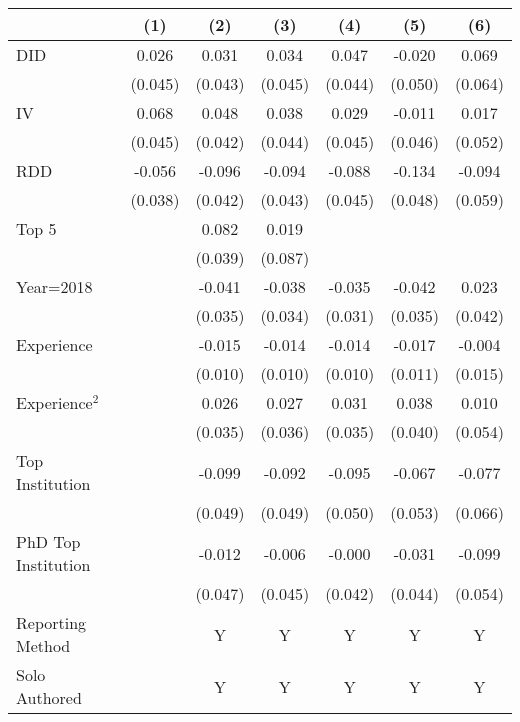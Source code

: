 \begin{tabular}{l*{6}{c}}
\hline\hline
                &\multicolumn{1}{c}{(1)}&\multicolumn{1}{c}{(2)}&\multicolumn{1}{c}{(3)}&\multicolumn{1}{c}{(4)}&\multicolumn{1}{c}{(5)}&\multicolumn{1}{c}{(6)}\\
\hline
DID             &    0.026&    0.031&    0.034&    0.047&   -0.020&    0.069\\
                &  (0.045)&  (0.043)&  (0.045)&  (0.044)&  (0.050)&  (0.064)\\
IV              &    0.068&    0.048&    0.038&    0.029&   -0.011&    0.017\\
                &  (0.045)&  (0.042)&  (0.044)&  (0.045)&  (0.046)&  (0.052)\\
RDD             &   -0.056&   -0.096&   -0.094&   -0.088&   -0.134&   -0.094\\
                &  (0.038)&  (0.042)&  (0.043)&  (0.045)&  (0.048)&  (0.059)\\
Top 5           &         &    0.082&    0.019&         &         &         \\
                &         &  (0.039)&  (0.087)&         &         &         \\
Year=2018       &         &   -0.041&   -0.038&   -0.035&   -0.042&    0.023\\
                &         &  (0.035)&  (0.034)&  (0.031)&  (0.035)&  (0.042)\\
Experience      &         &   -0.015&   -0.014&   -0.014&   -0.017&   -0.004\\
                &         &  (0.010)&  (0.010)&  (0.010)&  (0.011)&  (0.015)\\
Experience$^2$  &         &    0.026&    0.027&    0.031&    0.038&    0.010\\
                &         &  (0.035)&  (0.036)&  (0.035)&  (0.040)&  (0.054)\\
Top Institution &         &   -0.099&   -0.092&   -0.095&   -0.067&   -0.077\\
                &         &  (0.049)&  (0.049)&  (0.050)&  (0.053)&  (0.066)\\
PhD Top Institution&         &   -0.012&   -0.006&   -0.000&   -0.031&   -0.099\\
                &         &  (0.047)&  (0.045)&  (0.042)&  (0.044)&  (0.054)\\
Reporting Method &         &        Y&        Y&        Y&        Y&        Y\\
Solo Authored   &         &        Y&        Y&        Y&        Y&        Y\\

\end{tabular}
